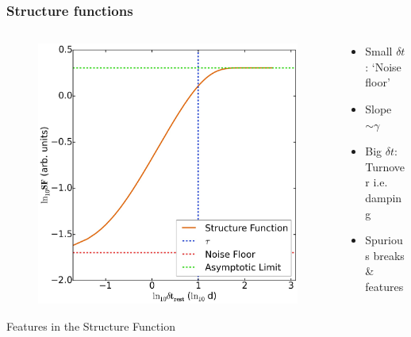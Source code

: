 \documentclass[hyperref={pdfpagelabels=false}]{beamer}
\begin{document}
\begin{frame}
\frametitle{Structure functions}
  \begin{columns}
    \centering
    \begin{column}{0.55\textwidth}
      \begin{figure}
        \includegraphics[scale=0.12]{images/SF_Illustration.jpg}
      \end{figure}
      \centering
      {\tiny Features in the Structure Function}
    \end{column}
    \begin{column}{0.45\textwidth}
       \begin{itemize}
       \item Small $\delta t$: `Noise floor'
       \item Slope $\sim \gamma$
       \item Big $\delta t$: Turnover i.e. damping
       \item Spurious breaks \& features {\tiny \citep{Emm10}}
       \end{itemize}
    \end{column}
  \end{columns}
\end{frame}
\end{document}
